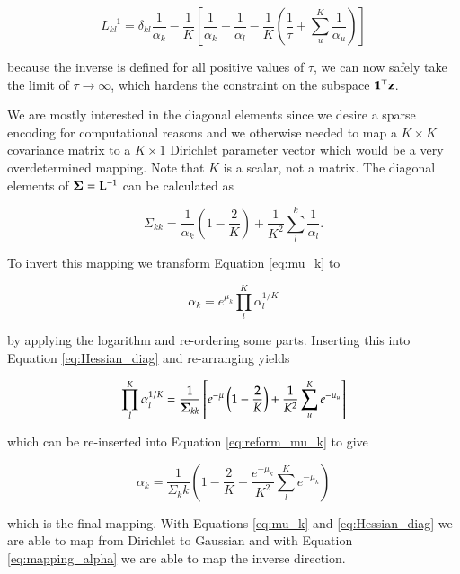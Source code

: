 \begin{equation}
    L_{kl}^{-1} = \delta_{kl} \frac{1}{\alpha_k} - \frac{1}{K} \left[\frac{1}{\alpha_k} + \frac{1}{\alpha_l} - \frac{1}{K}\left( \frac{1}{\tau} + \sum_u^K \frac{1}{\alpha_u}\right) \right]
\end{equation}

because the inverse is defined for all positive values of $\tau$, we can now safely take the limit of $\tau \rightarrow \infty$, which hardens the constraint on the subspace $\mathbf{1}^\top {\mathbf{z}}$.

We are mostly interested in the diagonal elements since we desire a sparse encoding for computational reasons and we otherwise needed to map a $K \times K$ covariance matrix to a $K\times 1$ Dirichlet parameter vector which would be a very overdetermined mapping. Note that $K$ is a scalar, not a matrix. The diagonal elements of ${\boldsymbol{\Sigma}} = {\mathbf{L}}^{-1}$ can be calculated as

\begin{equation}
    \label{eq:Hessian_diag}
    \Sigma_{kk} = \frac{1}{\alpha_k} \left(1 - \frac{2}{K}\right)  + \frac{1}{K^2} \sum_{l}^{k} \frac{1}{\alpha_l}.
\end{equation}

To invert this mapping we transform Equation \ref{eq:mu_k} to 

\begin{equation}
    \label{eq:reform_mu_k}
    \alpha_k = e^{\mu_k} \prod_l^{K} \alpha_l^{1/K}
\end{equation}

by applying the logarithm and re-ordering some parts. Inserting this into Equation \ref{eq:Hessian_diag} and re-arranging yields

\begin{equation}
    \prod_l^K \alpha_l^{1/K} = \frac{1}{{\boldsymbol{\Sigma}}_{kk}} \left[e^{-\mu}\left(1 - \frac{2}{K}\right)  + \frac{1}{K^2} \sum_u^K e^{-\mu_u} \right]
\end{equation}

which can be re-inserted into Equation \ref{eq:reform_mu_k} to give

\begin{equation}
    \label{eq:mapping_alpha}
    \alpha_k = \frac{1}{\Sigma_kk} \left(1 - \frac{2}{K} + \frac{e^{-\mu_k}}{K^2} \sum_l^K e^{-\mu_k} \right)
\end{equation}

which is the final mapping. With Equations \ref{eq:mu_k} and \ref{eq:Hessian_diag} we are able to map from Dirichlet to Gaussian and with Equation \ref{eq:mapping_alpha} we are able to map the inverse direction. 



